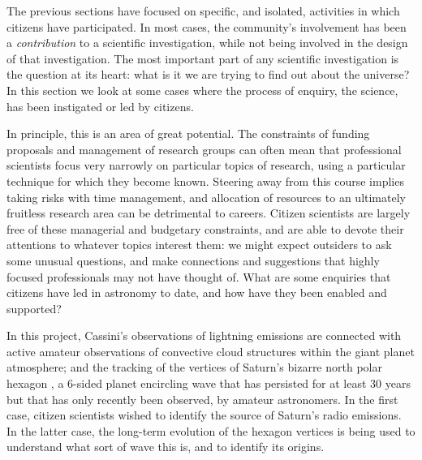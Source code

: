 \documentclass{ar2e}
\begin{document}
The previous sections have focused on specific, and isolated, activities in
which citizens have participated. In most cases, the community's involvement has
been a {\it contribution} to a scientific investigation, while not being
involved in the design of that investigation. The most important part of any
scientific investigation is the question at its heart: what is it we are trying
to find out about the universe? In this section we look at some cases where the
process of enquiry, the science, has been instigated or led by citizens.  

In principle, this is an area of great potential. The constraints of funding
proposals and management of research groups can often mean that professional
scientists focus very narrowly on particular topics of research, using a
particular technique for which they become known.  Steering away from this
course implies taking risks with time management, and allocation of resources to
an ultimately fruitless research area can be detrimental to careers.  Citizen
scientists are largely free of these managerial and budgetary constraints, and
are able to devote their attentions to whatever topics interest them: we might
expect outsiders to ask some unusual questions, and make connections and
suggestions that highly focused professionals may not have thought of. What are
some enquiries that citizens have led in astronomy to date, and how have they
been enabled and supported?


In this project, Cassini's observations of lightning emissions are connected
with active amateur observations of convective cloud structures within the giant
planet atmosphere; and the tracking of the vertices of Saturn's bizarre north
polar hexagon \citep{88godfrey}, a 6-sided planet encircling wave that has
persisted for at least 30 years but that has only recently been observed, by
amateur astronomers.  In the first case, citizen scientists wished to identify
the source of Saturn's radio emissions.  In the latter case, the long-term
evolution of the hexagon vertices is being used to understand what sort of wave
this is, and to identify its origins.
\end{document}
